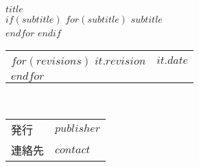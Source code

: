 \begin{titlepage}
    \begin{center}
        \textsf{$title$} \\
        $if(subtitle)$
            $for(subtitle)$
                $subtitle$ \\
            $endfor$
        $endif$
        \vspace*{1cm}
        \begin{tabular}{ll}
            $for(revisions)$
                $it.revision$ & $it.date$ \\
            $endfor$
        \end{tabular} \\
        \begin{tabular}{ll} \toprule
            発行   & $publisher$ \\
            連絡先 & $contact$ \\ \bottomrule
        \end{tabular}
    \end{center}
\end{titlepage}
